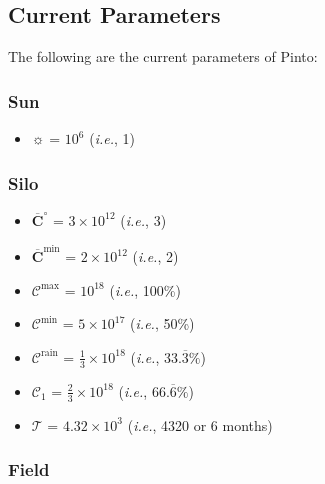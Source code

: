 \documentclass[class=article, crop=false]{standalone}
\begin{document}

\subsection{Current Parameters}

The following are the current parameters of Pinto:


\subsubsection{Sun}

\begin{itemize}[topsep=0pt, itemsep=3pt,leftmargin=16pt]
    \item $\sun$ = $10^{6}$ (\textit{i.e.}, 1)
\end{itemize}


\subsubsection{Silo}

\begin{itemize}[topsep=0pt, itemsep=3pt,leftmargin=16pt]
    \item $\overline{\mathbf{C}}^{\circ}$ = $3 \times 10^{12}$ (\textit{i.e.}, 3)
    \item $\overline{\mathbf{C}}^{\text{min}}$ = $2 \times 10^{12}$ (\textit{i.e.}, 2)
    \item $\mathscr{C}^{\text{max}}$ = $10^{18}$ (\textit{i.e.}, 100\%)
    \item $\mathscr{C}^{\text{min}}$ = $5 \times 10^{17}$ (\textit{i.e.}, 50\%)
    \item $\mathscr{C}^{\text{rain}}$ = $\frac{1}{3} \times 10^{18}$ (\textit{i.e.}, 33.$\overline{3}\%$)
    \item $\mathscr{C}_{1}$ = $\frac{2}{3} \times 10^{18}$ (\textit{i.e.}, 66.$\overline{6}\%$)
    \item $\mathscr{T}$ = $4.32 \times 10^{3}$ (\textit{i.e.}, 4320  or 6 months)
\end{itemize}


\subsubsection{Field}
\end{document}
